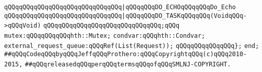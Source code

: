 \verb|qQQqqQQqqQQqqQQqqQQqqQQqqQQqqQQq|\verb#|qQQqqQQqDO_ECHOqQQqqQQqDo_Echo#\newline
\verb|qQQqqQQqqQQqqQQqqQQqqQQqqQQqqQQq|\verb#|qQQqqQQqDO_TASKqQQqqQQq(VoidqQQq->qQQqVoid)#\newline
\verb|qQQqqQQqqQQqqQQqqQQqqQQqqQQqqQQq;qQQq|\newline
\verb|mutex:qQQqqQQqqQQqhth::Mutex;|\newline
\verb|condvar:qQQqhth::Condvar;|\newline
\verb|external_request_queue:qQQqRef(List(Request));|\newline
\verb|qQQqqQQqqQQqqQQq};|\newline
\verb|end;|\newline
\newline
\verb|##qQQqCodeqQQqbyqQQqJeffqQQqProthero:qQQqCopyrightqQQq(c)qQQq2010-2015,|\newline
\verb|##qQQqreleasedqQQqperqQQqtermsqQQqofqQQqSMLNJ-COPYRIGHT.|\newline

